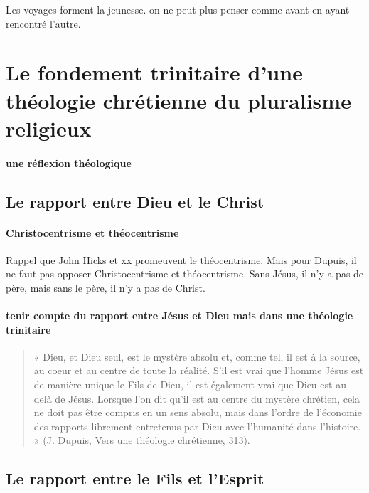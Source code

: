 \begin{Prop}
    Les voyages forment la jeunesse. on ne peut plus penser comme avant en ayant rencontré l'autre.
\end{Prop}

\section{Le fondement trinitaire d’une théologie chrétienne du pluralisme religieux}


\paragraph{une réflexion théologique} 


\subsection{Le rapport entre Dieu et le Christ}

\paragraph{Christocentrisme et théocentrisme} Rappel que John Hicks et xx promeuvent le théocentrisme. Mais pour Dupuis, il ne faut pas opposer Christocentrisme et théocentrisme. Sans Jésus, il n'y a pas de père, mais sans le père, il n'y a pas de Christ.

\paragraph{tenir compte du rapport entre Jésus et Dieu mais dans une théologie trinitaire}

\begin{quote}
    « Dieu, et Dieu seul, est le mystère absolu et, comme tel, il est à la source, au coeur et au centre de
toute la réalité. S’il est vrai que l’homme Jésus est de manière unique le Fils de Dieu, il est également
vrai que Dieu est au-delà de Jésus. Lorsque l’on dit qu’il est au centre du mystère chrétien, cela ne doit
pas être compris en un sens absolu, mais dans l’ordre de l’économie des rapports librement entretenus
par Dieu avec l’humanité dans l’histoire. » (J. Dupuis, Vers une théologie chrétienne, 313).
\end{quote}

\subsection{Le rapport entre le Fils et l’Esprit}

